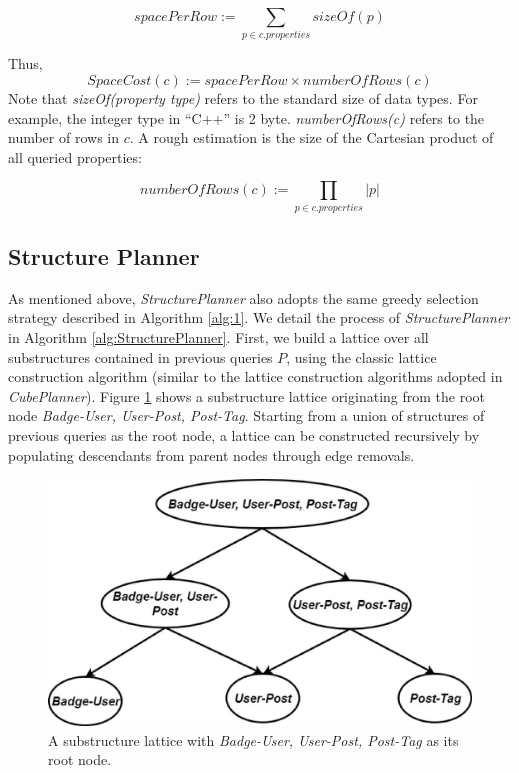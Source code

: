 \begin{displaymath}
spacePerRow:=
\displaystyle{\sum_{p\in c.properties}sizeOf(p)}
\end{displaymath}

\noindent Thus,
\begin{displaymath}
SpaceCost(c):= spacePerRow \times numberOfRows(c)
\end{displaymath}
Note that \textit{sizeOf(property type)} refers to the standard size of data types. For example, the integer type in ``C++'' is 2 byte. \textit{numberOfRows(c)} refers to the number of rows in $c$. A rough estimation is the size of the Cartesian product of all queried properties:

\begin{displaymath}
numberOfRows(c):= \displaystyle{\prod_{p\in c.properties}|p|}
\end{displaymath}


\subsection{Structure Planner}
\label{Structure Planner}
As mentioned above, \emph{StructurePlanner} also adopts the same greedy selection strategy described in Algorithm \ref{alg:1}. We detail the process of \emph{StructurePlanner} in Algorithm \ref{alg:StructurePlanner}. First, we build a lattice over all substructures contained in previous queries $P$, using the classic lattice construction algorithm (similar to the lattice construction algorithms adopted in \emph{CubePlanner}). Figure \ref{fig:4:3} shows a substructure lattice originating from the root node \textit{Badge-User, User-Post, Post-Tag}. Starting from a union of structures of previous queries as the root node, a lattice can be constructed recursively by populating descendants from parent nodes through edge removals.

\begin {figure}[h]
\centering
\includegraphics[scale=0.4]{pic/Structurelattice.eps}
\caption{A substructure lattice with \textit{Badge-User, User-Post, Post-Tag} as its root node.}
\label{fig:4:3}
\end{figure}



